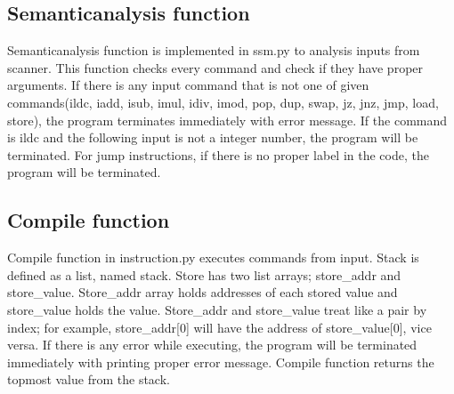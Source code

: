 \documentclass[11pt]{article}
\begin{document}
	\subsection{Semanticanalysis function}
	Semanticanalysis function is implemented in ssm.py to analysis inputs from scanner. This function checks every command and check if they have proper arguments. If there is any input command that is not one of given commands(ildc, iadd, isub, imul, idiv, imod, pop, dup, swap, jz, jnz, jmp, load, store), the program terminates immediately with error message. If the command is ildc and the following input is not a integer number, the program will be terminated. For jump instructions, if there is no proper label in the code, the program will be terminated. 
	\subsection{Compile function}
	Compile function in instruction.py executes commands from input. Stack is defined as a list, named stack. Store has two list arrays; store\_addr and store\_value. Store\_addr array holds addresses of each stored value and store\_value holds the value. Store\_addr and store\_value treat like a pair by index; for example, store\_addr[0] will have the address of store\_value[0], vice versa. If there is any error while executing, the program will be terminated immediately with printing proper error message. Compile function returns the top\-most value from the stack.
\end{document}

